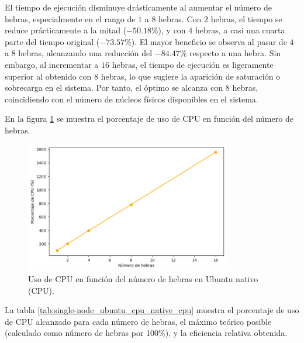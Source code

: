 El tiempo de ejecución disminuye drásticamente al aumentar el número de hebras, especialmente en el rango de $1$ a $8$ hebras. Con $2$ hebras, el tiempo se reduce prácticamente a la mitad ($-50.18\%$), y con $4$ hebras, a casi una cuarta parte del tiempo original ($-73.57\%$). El mayor beneficio se observa al pasar de $4$ a $8$ hebras, alcanzando una reducción del $-84.47\%$ respecto a una hebra. Sin embargo, al incrementar a $16$ hebras, el tiempo de ejecución es ligeramente superior al obtenido con $8$ hebras, lo que sugiere la aparición de saturación o sobrecarga en el sistema. Por tanto, el óptimo se alcanza con $8$ hebras, coincidiendo con el número de núcleos físicos disponibles en el sistema.

En la figura \ref{fig:single-node_ubuntu_cpu_native_cpu} se muestra el porcentaje de uso de CPU en función del número de hebras.

\begin{figure}[H]
    \centering
    \includegraphics[width=0.8\textwidth]{imagenes/cap5/single-node_ubuntu_cpu_native_cpu.png}
    \caption{Uso de CPU en función del número de hebras en Ubuntu nativo (CPU).}
    \label{fig:single-node_ubuntu_cpu_native_cpu}
\end{figure}

La tabla \ref{tab:single-node_ubuntu_cpu_native_cpu} muestra el porcentaje de uso de CPU alcanzado para cada número de hebras, el máximo teórico posible (calculado como número de hebras por 100\%), y la eficiencia relativa obtenida.

